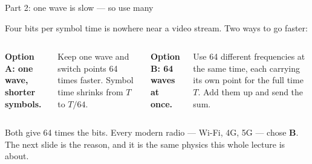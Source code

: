 \begin{frame}{Part 2: one wave is slow --- so use many}
  \vspace{0.3em}
  {\small Four bits per symbol time is nowhere near a video stream. Two ways to go
   faster:\par}
  \vspace{0.5em}
  \begin{columns}[T,onlytextwidth]
      {\small\textbf{\textcolor{ranpurple}{Option A: one wave, shorter symbols.}}\par}
      \vspace{0.3em}
      {\small Keep one wave and switch points 64 times faster. Symbol time shrinks
       from $T$ to $T/64$.\par}
      {\small\textbf{\textcolor{softgreen}{Option B: 64 waves at once.}}\par}
      \vspace{0.3em}
      {\small Use 64 different frequencies at the same time, each carrying its own
       point for the full time $T$. Add them up and send the sum.\par}
  \end{columns}

  \vspace{0.8em}
  {\small Both give 64 times the bits. Every modern radio --- Wi-Fi, 4G, 5G --- chose
   \textbf{B}. The next slide is the reason, and it is the same physics this whole
   lecture is about.\par}

  \vspace{0.3em}
\end{frame}

